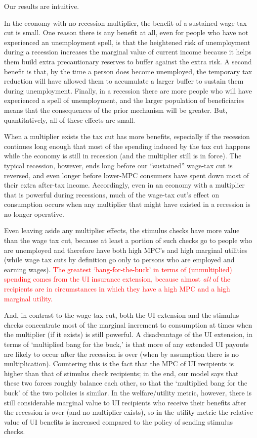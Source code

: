 \documentclass[../HAFiscal]{subfiles}
\begin{document}
Our results are intuitive. 

In the economy with no recession multiplier, the benefit of a sustained wage-tax cut is small.  One reason there is any benefit at all, even for people who have not experienced an unemployment spell, is that the heightened risk of unemployment during a recession increases the marginal value of current income because it helps them build extra precautionary reserves to buffer against the extra risk.  A second benefit is that, by the time a person does become unemployed, the temporary tax reduction will have allowed them to accumulate a larger buffer to sustain them during unemployment.  Finally, in a recession there are more people who will have experienced a spell of unemployment, and the larger population of beneficiaries means that the consequences of the prior mechanism will be greater.  But, quantitatively, all of these effects are small.

When a multiplier exists the tax cut has more benefits, especially if the recession continues long enough that most of the spending induced by the tax cut happens while the economy is still in recession (and the multiplier still is in force).  The typical recession, however, ends long before our ``sustained'' wage-tax cut is reversed, and even longer before lower-MPC consumers have spent down most of their extra after-tax income. Accordingly, even in an economy with a multiplier that is powerful during recessions, much of the wage-tax cut's effect on consumption occurs when any multiplier that might have existed in a recession is no longer operative.

Even leaving aside any multiplier effects, the stimulus checks have more value than the wage tax cut, because at least a portion of such checks go to people who are unemployed and therefore have both high MPC's and high marginal utilities (while wage tax cuts by definition go only to persons who are employed and earning wages). \textcolor{red}{The greatest `bang-for-the-buck' in terms of (unmultiplied) spending comes from the UI insurance extension, because almost \textit{all} of the recipients are in circumstances in which they have a high MPC and a high marginal utility.}

And, in contrast to the wage-tax cut, both the UI extension and the stimulus checks concentrate most of the marginal increment to consumption at times when the multiplier (if it exists) is still powerful.  A disadvantage of the UI extension, in terms of `multiplied bang for the buck,' is that more of any extended UI payouts are likely to occur after the recession is over (when by assumption there is no multiplication).  Countering this is the fact that the MPC of UI recipients is higher than that of stimulus check recipients; in the end, our model says that these two forces roughly balance each other, so that the `multiplied bang for the buck' of the two policies is similar.  In the welfare/utility metric, however, there is still considerable marginal value to UI recipients who receive their benefits after the recession is over (and no multiplier exists), so in the utility metric the relative value of UI benefits is increased compared to the policy of sending stimulus checks.
\end{document}
